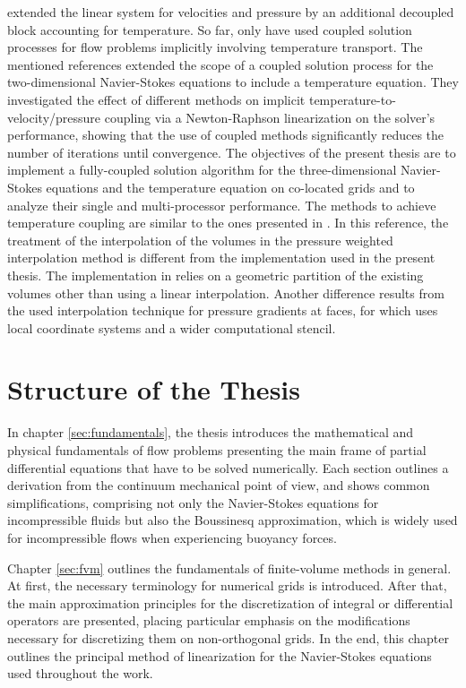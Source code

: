 \cite{chen10} extended the linear system for velocities and pressure by an additional decoupled block accounting for temperature. So far, only \cite{galpin86,vakilipour12} have used coupled solution processes for flow problems implicitly involving temperature transport. The mentioned references extended the scope of a coupled solution process for the two-dimensional Navier-Stokes equations to include a temperature equation. They investigated the effect of different methods on implicit temperature-to-velocity/pressure coupling via a Newton-Raphson linearization on the solver's performance, showing that the use of coupled methods significantly reduces the number of iterations until convergence. The objectives of the present thesis are to implement a fully-coupled solution algorithm for the three-dimensional Navier-Stokes equations and the temperature equation on co-located grids and to analyze their single and multi-processor performance. The methods to achieve temperature coupling are similar to the ones presented in \cite{vakilipour12}. In this reference, the treatment of the interpolation of the volumes in the pressure weighted interpolation method is different from the implementation used in the present thesis. The implementation in \cite{vakilipour12} relies on a geometric partition of the existing volumes other than using a linear interpolation. Another difference results from the used interpolation technique for pressure gradients at faces, for which \cite{vakilipour12} uses local coordinate systems and a wider computational stencil.

\section{Structure of the Thesis}

In chapter \ref{sec:fundamentals}, the thesis introduces the mathematical and physical fundamentals of flow problems presenting the main frame of partial differential equations that have to be solved numerically. Each section outlines a derivation from the continuum mechanical point of view, and shows common simplifications, comprising not only the Navier-Stokes equations for incompressible fluids but also the Boussinesq approximation, which is widely used for incompressible flows when experiencing buoyancy forces.

Chapter \ref{sec:fvm} outlines the fundamentals of finite-volume methods in general. At first, the necessary terminology for numerical grids is introduced. After that, the main approximation principles for the discretization of integral or differential operators are presented, placing particular emphasis on the modifications necessary for discretizing them on non-orthogonal grids. In the end, this chapter outlines the principal method of linearization for the Navier-Stokes equations used throughout the work.


